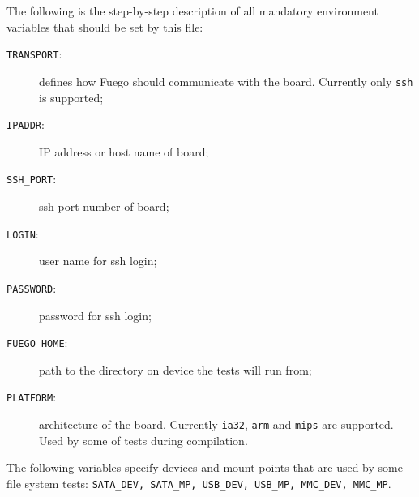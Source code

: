 The following is the step-by-step description of all mandatory environment variables that should be set by this file:

\begin{description}
\item[\texttt{TRANSPORT}:] defines how Fuego should communicate with the board.
  Currently only \texttt{ssh} is supported;
\item[\texttt{IPADDR}:]  IP address or host name of board;
\item[\texttt{SSH\_PORT}:]  ssh port number of board;
\item[\texttt{LOGIN}:]  user name for ssh login;
\item[\texttt{PASSWORD}:] password for ssh login;
\item[\texttt{FUEGO\_HOME}:] path to the directory on device the tests will run from;
\item[\texttt{PLATFORM}:] architecture of the board.
  Currently \texttt{ia32}, \texttt{arm} and \texttt{mips} are supported. Used by some of tests during compilation.
\end{description}

The following variables specify devices and mount points that are used by some
file system tests: \texttt{SATA\_DEV, SATA\_MP, USB\_DEV, USB\_MP, MMC\_DEV, MMC\_MP}.




